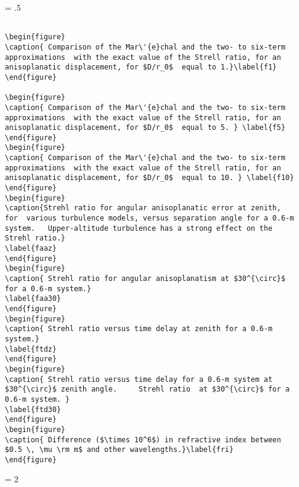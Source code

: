 \newpage
\baselineskip = .5\baselineskip  %
\begin{verbatim}

\begin{figure}
\caption{ Comparison of the Mar\'{e}chal and the two- to six-term
approximations  with the exact value of the Strell ratio, for an
anisoplanatic displacement, for $D/r_0$  equal to 1.}\label{f1}
\end{figure}

\begin{figure}
\caption{ Comparison of the Mar\'{e}chal and the two- to six-term
approximations  with the exact value of the Strell ratio, for an
anisoplanatic displacement, for $D/r_0$  equal to 5. } \label{f5}
\end{figure}
\begin{figure}
\caption{ Comparison of the Mar\'{e}chal and the two- to six-term
approximations  with the exact value of the Strell ratio, for an
anisoplanatic displacement, for $D/r_0$  equal to 10. } \label{f10}
\end{figure}
\begin{figure}
\caption{Strehl ratio for angular anisoplanatic error at zenith,
for  various turbulence models, versus separation angle for a 0.6-m
system.   Upper-altitude turbulence has a strong effect on the
Strehl ratio.}
\label{faaz}
\end{figure}
\begin{figure}
\caption{ Strehl ratio for angular anisoplanatism at $30^{\circ}$
for a 0.6-m system.}
\label{faa30}
\end{figure}
\begin{figure}
\caption{ Strehl ratio versus time delay at zenith for a 0.6-m
system.}
\label{ftdz}
\end{figure}
\begin{figure}
\caption{ Strehl ratio versus time delay for a 0.6-m system at
$30^{\circ}$ zenith angle.     Strehl ratio  at $30^{\circ}$ for a
0.6-m system. }
\label{ftd30}
\end{figure}
\begin{figure}
\caption{ Difference ($\times 10^6$) in refractive index between
$0.5 \, \mu \rm m$ and other wavelengths.}\label{fri}
\end{figure}

\end{verbatim}
\newpage
\baselineskip = 2\baselineskip  %

